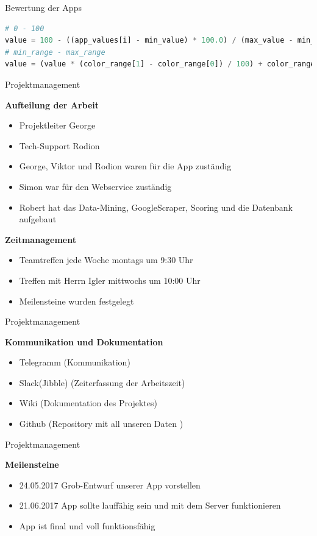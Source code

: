 \documentclass[compress,t]{beamer}
\begin{document}
\begin{frame}[fragile]{Bewertung der Apps}
    \begin{lstlisting}[language=Python]
# 0 - 100
value = 100 - ((app_values[i] - min_value) * 100.0) / (max_value - min_value)
# min_range - max_range
value = (value * (color_range[1] - color_range[0]) / 100) + color_range[0]
    \end{lstlisting}

\end{frame}

\begin{frame}{Projektmanagement}


    \textbf{Aufteilung der Arbeit}
     \begin{itemize}
          \item Projektleiter George
          \item Tech-Support Rodion
          \item George, Viktor und Rodion waren für die App zuständig
          \item Simon war für den Webservice zuständig
          \item Robert hat das Data-Mining, GoogleScraper, Scoring und die Datenbank aufgebaut
     \end{itemize}
    \textbf{Zeitmanagement}
        \begin{itemize}
          \item Teamtreffen jede Woche montags um 9:30 Uhr
          \item Treffen mit Herrn Igler mittwochs um 10:00 Uhr
          \item Meilensteine wurden festgelegt
        \end{itemize}

\end{frame}
\begin{frame}{Projektmanagement}

    \textbf{Kommunikation und Dokumentation}
     \begin{itemize}
          \item Telegramm (Kommunikation)
          \item Slack(Jibble) (Zeiterfassung der Arbeitszeit)
          \item Wiki (Dokumentation des Projektes)
          \item Github (Repository mit all unseren Daten )
    \end{itemize}

\end{frame}
\begin{frame}{Projektmanagement}

    \textbf{Meilensteine}
     \begin{itemize}
          \item 24.05.2017 Grob-Entwurf unserer App vorstellen
          \item 21.06.2017 App sollte lauffähig sein und mit dem Server funktionieren
          \item App ist final und voll funktionsfähig
    \end{itemize}

\end{frame}
\end{document}
